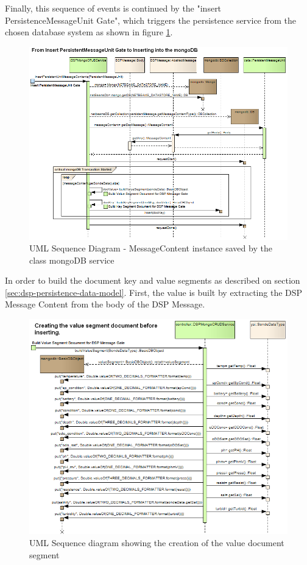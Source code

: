 Finally, this sequence of events is continued by the "insert
PersistenceMessageUnit Gate", which triggers the persistence service from the
chosen database system as shown in figure
\ref{fig:From-Insert-PersistentMessageUnit-to-mongoDB}.

\begin{figure}[!b]
  \centering
  \includegraphics[scale=0.5]{../diagrams/From-Insert-PersistentMessageUnit-to-mongoDB}
  \caption{UML Sequence Diagram - MessageContent instance saved by the class
  mongoDB service}
  \label{fig:From-Insert-PersistentMessageUnit-to-mongoDB}
\end{figure}

In order to build the document key and value segments as described on section
\ref{sec:dsp-persistence-data-model}. First, the value is built by extracting
the DSP Message Content from the body of the DSP Message.

\begin{figure}[!b]
  \centering
  \includegraphics[scale=0.5]{../diagrams/From-Creating-Value-Segment-Sequence}
  \caption{UML Sequence diagram showing the creation of the value document segment}
  \label{fig:From-Creating-Value-Segment-Sequence}
\end{figure}


